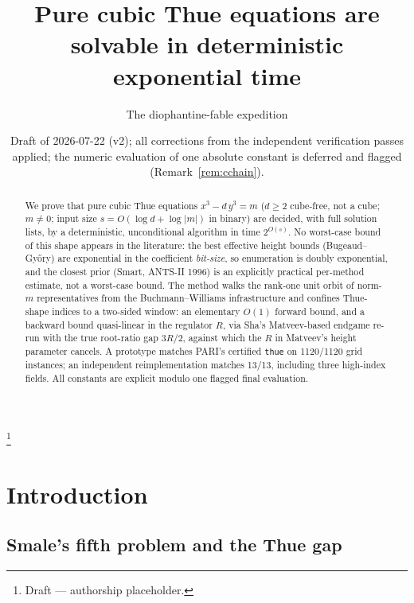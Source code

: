 \documentclass[11pt]{amsart}
\theoremstyle{plain}
\theoremstyle{remark}
\begin{document}
\title{Pure cubic Thue equations are solvable in deterministic
  exponential time}

\author{The diophantine-fable expedition}
\thanks{Draft --- authorship placeholder.}

\date{Draft of 2026-07-22 (v2); all corrections from the independent
  verification passes applied; the numeric evaluation of one absolute
  constant is deferred and flagged (Remark~\ref{rem:cchain}).}

\begin{abstract}
We prove that pure cubic Thue equations $x^3 - d\,y^3 = m$ ($d \ge 2$
cube-free, not a cube; $m \ne 0$; input size $s = O(\log d + \log|m|)$
in binary) are decided, with full solution lists, by a deterministic,
unconditional algorithm in time $2^{O(s)}$. No worst-case bound of this
shape appears in the literature: the best effective height bounds
(Bugeaud--Gy\H{o}ry) are exponential in the coefficient
\emph{bit-size}, so enumeration is doubly exponential, and the closest
prior (Smart, ANTS-II 1996) is an explicitly practical per-method
estimate, not a worst-case bound. The method walks the rank-one unit orbit of
norm-$m$ representatives from the Buchmann--Williams infrastructure and
confines Thue-shape indices to a two-sided window: an elementary $O(1)$
forward bound, and a backward bound quasi-linear in the regulator $R$,
via Sha's Matveev-based endgame re-run with the true root-ratio gap
$3R/2$, against which the $R$ in Matveev's height parameter cancels. A
prototype matches PARI's certified \texttt{thue} on 1120/1120 grid
instances; an independent reimplementation matches 13/13, including
three high-index fields. All constants are explicit modulo
one flagged final evaluation.
\end{abstract}

\maketitle

\section{Introduction}\label{sec:intro}

\subsection{Smale's fifth problem and the Thue gap}\label{sec:smale}
\end{document}
